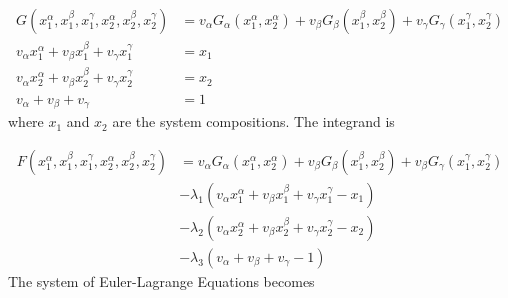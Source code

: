 \documentclass[10pt]{article}
\begin{document}
\begin{align}
  G(x_1^{\alpha}, x_1^{\beta}, x_1^{\gamma}, x_2^{\alpha}, x_2^{\beta}, x_2^{\gamma})
  &= v_{\alpha} G_{\alpha}(x_1^{\alpha},x_2^{\alpha})
    + v_{\beta} G_{\beta}(x_1^{\beta}, x_2^{\beta})
    + v_{\gamma} G_{\gamma}(x_1^{\gamma}, x_2^{\gamma})\\
  v_{\alpha} x_1^{\alpha} + v_{\beta} x_1^{\beta} + v_{\gamma} x_1^{\gamma} &= x_1\\
  v_{\alpha} x_2^{\alpha} + v_{\beta} x_2^{\beta} + v_{\gamma} x_2^{\gamma} &= x_2\\
  v_{\alpha} + v_{\beta} + v_{\gamma} &= 1
\end{align}
where $x_1$ and $x_2$ are the system compositions. The integrand is

\begin{align}
  \nonumber
  F(x_1^{\alpha}, x_1^{\beta}, x_1^{\gamma}, x_2^{\alpha}, x_2^{\beta}, x_2^{\gamma})
  &= v_{\alpha} G_{\alpha}(x_1^{\alpha}, x_2^{\alpha})
   + v_{\beta} G_{\beta}(x_1^{\beta}, x_2^{\beta})
   + v_{\beta} G_{\gamma}(x_1^{\gamma}, x_2^{\gamma})\\
  \nonumber
  &- \lambda_1(v_{\alpha} x_1^{\alpha} + v_{\beta} x_1^{\beta} + v_{\gamma} x_1^{\gamma} - x_1)\\
  \nonumber
  &- \lambda_2(v_{\alpha} x_2^{\alpha} + v_{\beta} x_2^{\beta} + v_{\gamma} x_2^{\gamma} - x_2)\\
  &- \lambda_3(v_{\alpha} + v_{\beta} + v_{\gamma} - 1)
\end{align}
The system of Euler-Lagrange Equations becomes
\end{document}
